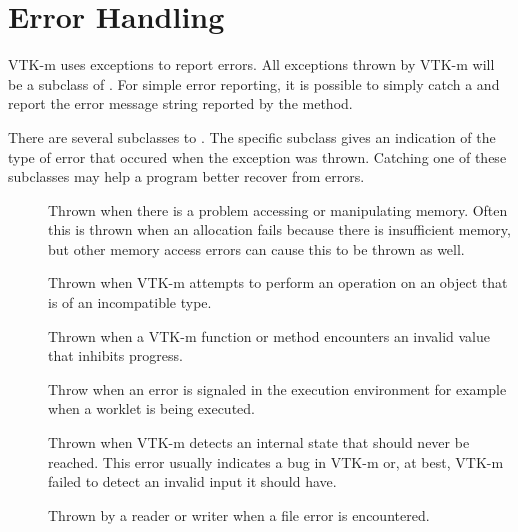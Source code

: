\section{Error Handling}
\label{sec:ErrorHandlingControl}



VTK-m uses exceptions to report errors. All exceptions thrown by VTK-m will
be a subclass of . For simple error reporting, it is
possible to simply catch a  and report the error message
string reported by the  method.


There are several subclasses to . The specific subclass
gives an indication of the type of error that occured when the exception
was thrown. Catching one of these subclasses may help a program better
recover from errors.
\begin{description}
\item[] Thrown when there is a problem
  accessing or manipulating memory. Often this is thrown when an allocation
  fails because there is insufficient memory, but other memory access
  errors can cause this to be thrown as well.
\item[] Thrown when VTK-m attempts to perform
  an operation on an object that is of an incompatible type.
\item[] Thrown when a VTK-m function or
  method encounters an invalid value that inhibits progress.
\item[]  Throw
  when an error is signaled in the execution environment for example when a
  worklet is being executed.
\item[] Thrown when VTK-m detects an
  internal state that should never be reached. This error usually indicates
  a bug in VTK-m or, at best, VTK-m failed to detect an invalid input it
  should have.
\item[] Thrown by a reader or writer when a file error is
  encountered.
\end{description}



